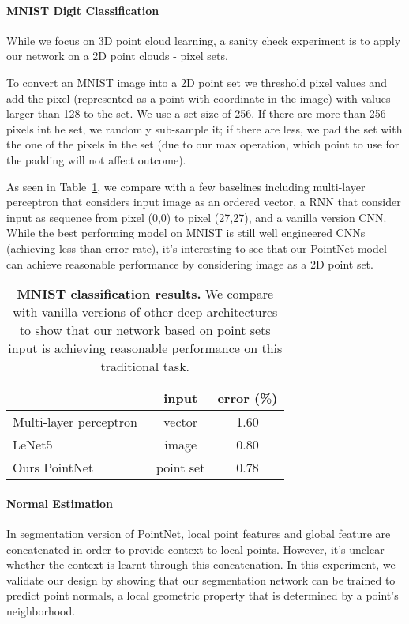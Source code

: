 \documentclass[10pt,twocolumn,letterpaper]{article}
\begin{document}
\paragraph{MNIST Digit Classification}
While we focus on 3D point cloud learning, a sanity check experiment is to apply our network on a 2D point clouds - pixel sets.

To convert an MNIST image into a 2D point set we threshold pixel values and add the pixel (represented as a point with  coordinate in the image) with values larger than 128 to the set. We use a set size of 256. If there are more than 256 pixels int he set, we randomly sub-sample it; if there are less, we pad the set with the one of the pixels in the set (due to our max operation, which point to use for the padding will not affect outcome).


As seen in Table~\ref{tab:mnist}, we compare with a few baselines including multi-layer perceptron that considers input image as an ordered vector, a RNN that consider input as sequence from pixel (0,0) to pixel (27,27), and a vanilla version CNN. While the best performing model on MNIST is still well engineered CNNs (achieving less than  error rate), it's interesting to see that our PointNet model can achieve reasonable performance by considering image as a 2D point set.

\begin{table}[h!]
    \centering
    \begin{tabular}[width=\linewidth]{l|c|c}
    \hline
    ~                      & input & error (\%) \\ \hline
    Multi-layer perceptron~\cite{simard2003best} & vector & 1.60  \\
    LeNet5~\cite{lecun1998gradient}                 & image & 0.80 \\ \hline
    Ours PointNet          & point set & 0.78 \\ \hline
    \end{tabular}
    \caption{\textbf{MNIST classification results.} We compare with vanilla versions of other deep architectures to show that our network based on point sets input is achieving reasonable performance on this traditional task.}
    \label{tab:mnist}
\end{table}

\paragraph{Normal Estimation}
In segmentation version of PointNet, local point features and global feature are concatenated in order to provide context to local points. However, it's unclear whether the context is learnt through this concatenation. In this experiment, we validate our design by showing that our segmentation network can be trained to predict point normals, a local geometric property that is determined by a point's neighborhood.
\end{document}
